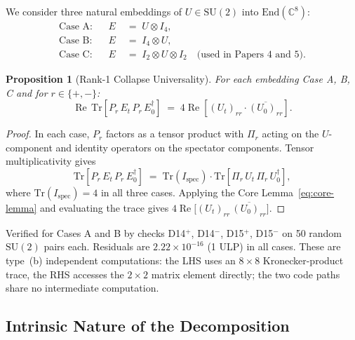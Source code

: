 \documentclass[12pt]{article}
\numberwithin{equation}{section}
\theoremstyle{plain}
\newtheorem{proposition}{Proposition}[section]
\theoremstyle{definition}
\theoremstyle{remark}
\newcommand{\su}{\mathrm{SU}}              %
\newcommand{\tr}{\mathrm{Tr}}              %
\newcommand{\Cplx}{\mathbb{C}}             %
\newcommand{\Pir}{\Pi_{r}}                 %
\begin{document}
	We consider three natural embeddings of $U\in\su(2)$ into
	$\mathrm{End}(\Cplx^{8})$:
	\begin{align*}
		\text{Case A:} && E &\;=\; U\otimes I_{4},\\
		\text{Case B:} && E &\;=\; I_{4}\otimes U,\\
		\text{Case C:} && E &\;=\; I_{2}\otimes U\otimes I_{2}
		\quad\text{(used in Papers~4 and~5)}.
	\end{align*}
	
	\begin{proposition}[Rank-1 Collapse Universality]
		\label{prop:rank1-univ}
		For each embedding Case A, B, C and for $r\in\{+,-\}$:
		\begin{equation}
			\operatorname{Re}\,\tr\!\left[P_{r}\, E_{t}\, P_{r}\,
			E_{0}^{\dagger}\right]
			\;=\; 4\operatorname{Re}\!\left[(U_t)_{rr}\cdot
			\overline{(U_0)_{rr}}\right].
			\label{eq:rank1-univ}
		\end{equation}
	\end{proposition}
	
	\begin{proof}
		In each case, $P_r$ factors as a tensor product with $\Pir$
		acting on the $U$-component and identity operators on the
		spectator components.  Tensor multiplicativity gives
		\[
		\tr\!\left[P_{r}\, E_{t}\, P_{r}\, E_{0}^{\dagger}\right]
		\;=\; \tr(I_{\mathrm{spec}})\cdot
		\tr\!\left[\Pir\, U_{t}\,\Pir\, U_{0}^{\dagger}\right],
		\]
		where $\tr(I_{\mathrm{spec}}) = 4$ in all three cases.  Applying
		the Core Lemma~\eqref{eq:core-lemma} and evaluating the trace
		gives $4\operatorname{Re}\!\bigl[(U_t)_{rr}\,
		\overline{(U_0)_{rr}}\bigr]$.
	\end{proof}
	
	Verified for Cases A and B by checks D14$^{+}$, D14$^{-}$,
	D15$^{+}$, D15$^{-}$ on 50 random $\su(2)$ pairs each.  Residuals are
	$2.22\times 10^{-16}$ (1 ULP) in all cases.  These are type~(b)
	independent computations: the LHS uses an $8\times 8$ Kronecker-product
	trace, the RHS accesses the $2\times 2$ matrix element directly; the
	two code paths share no intermediate computation.
	
	\subsection{Intrinsic Nature of the Decomposition}
	\label{sec:cor-intrinsic}
	
\end{document}
